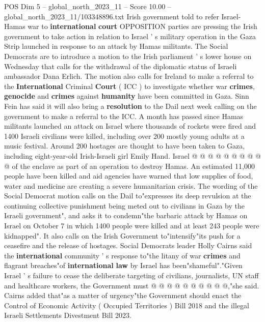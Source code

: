 \begin{textsample}{POS Dim 5 – global\_north\_2023\_11 – Score 10.00 – global\_north\_2023\_11/103348896.txt}  \label{ex:f5_pos_412}
Irish government told to refer Israel-Hamas war to \textbf{international} \textbf{court} OPPOSITION parties are pressing the Irish government to take action in relation to Israel ' s military operation in the Gaza Strip launched in response to an attack by Hamas militants.
The Social Democrats are to introduce a motion to the Irish parliament ' s lower house on Wednesday that calls for the withdrawal of the diplomatic status of Israeli ambassador Dana Erlich.
The motion also calls for Ireland to make a referral to the \textbf{International} Criminal \textbf{Court} ( ICC ) to investigate whether war \textbf{crimes}, \textbf{genocide} and \textbf{crimes} against \textbf{humanity} have been committed in Gaza.
Sinn Fein has said it will also bring a \textbf{resolution} to the Dail next week calling on the government to make a referral to the ICC.
A month has passed since Hamas militants launched an attack on Israel where thousands of rockets were fired and 1400 Israeli civilians were killed, including over 200 mostly young adults at a music festival.
Around 200 hostages are thought to have been taken to Gaza, including eight-year-old Irish-Israeli girl Emily Hand.
Israel @ @ @ @ @ @ @ @ @ @ of the enclave as part of an operation to destroy Hamas.
An estimated 11,000 people have been killed and aid agencies have warned that low supplies of food, water and medicine are creating a severe humanitarian crisis.
The wording of the Social Democrat motion calls on the Dail to"expresses its deep revulsion at the continuing collective punishment being meted out to civilians in Gaza by the Israeli government", and asks it to condemn"the barbaric attack by Hamas on Israel on October 7 in which 1400 people were killed and at least 243 people were kidnapped".
It also calls on the Irish Government to"intensify"its push for a ceasefire and the release of hostages.
Social Democrats leader Holly Cairns said the \textbf{international} community ' s response to"the litany of war \textbf{crimes} and flagrant breaches"of \textbf{international} \textbf{law} by Israel has been"shameful"."Given Israel ' s failure to cease the deliberate targeting of civilians, journalists, UN staff and healthcare workers, the Government must @ @ @ @ @ @ @ @ @ @,"she said.
Cairns added that"as a matter of urgency"the Government should enact the Control of Economic Activity ( Occupied Territories ) Bill 2018 and the illegal Israeli Settlements Divestment Bill 2023.

\end{textsample}
